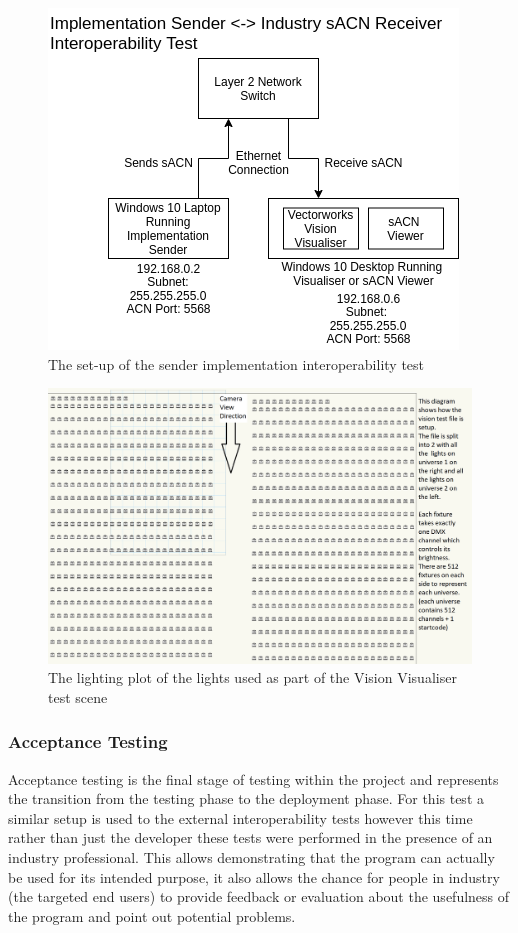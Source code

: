 \documentclass[11pt,a4paper]{article}
\begin{document}
\begin{figure}[H]
	\label{VIS_VIEWER_SETUP}
	\includegraphics[width=\textwidth]{CS4099-Visualiser-setup.png}
	\caption{The set-up of the sender implementation interoperability test}
\end{figure}

\begin{figure}[H]
	\label{VIS_LX_PLOT}
	\includegraphics[width=\textwidth]{Vision-File-LX-Plot.png}
	\caption{The lighting plot of the lights used as part of the Vision Visualiser test scene}
\end{figure}

\subsubsection{Acceptance Testing}
Acceptance testing is the final stage of testing within the project and represents the transition from the testing phase to the deployment phase. For this test a similar setup is used to the external interoperability tests however this time rather than just the developer these tests were performed in the presence of an industry professional. This allows demonstrating that the program can actually be used for its intended purpose, it also allows the chance for people in industry (the targeted end users) to provide feedback or evaluation about the usefulness of the program and point out potential problems. \\
\end{document}
